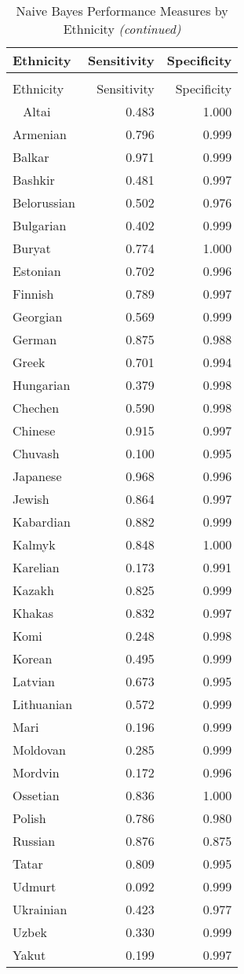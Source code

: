 \begingroup\fontsize{7}{9}\selectfont

\begin{longtable}{lrr}
\caption{\label{tab:sens_spec}Naive Bayes Performance Measures by Ethnicity}\\
\toprule
Ethnicity & Sensitivity & Specificity\\
\midrule
\endfirsthead
\caption[]{Naive Bayes Performance Measures by Ethnicity \textit{(continued)}}\\
\toprule
Ethnicity & Sensitivity & Specificity\\
\midrule
\endhead
\
\endfoot
\bottomrule
\endlastfoot
Altai & 0.483 & 1.000\\
Armenian & 0.796 & 0.999\\
Balkar & 0.971 & 0.999\\
Bashkir & 0.481 & 0.997\\
Belorussian & 0.502 & 0.976\\
Bulgarian & 0.402 & 0.999\\
Buryat & 0.774 & 1.000\\
Estonian & 0.702 & 0.996\\
Finnish & 0.789 & 0.997\\
Georgian & 0.569 & 0.999\\
German & 0.875 & 0.988\\
Greek & 0.701 & 0.994\\
Hungarian & 0.379 & 0.998\\
Chechen & 0.590 & 0.998\\
Chinese & 0.915 & 0.997\\
Chuvash & 0.100 & 0.995\\
Japanese & 0.968 & 0.996\\
Jewish & 0.864 & 0.997\\
Kabardian & 0.882 & 0.999\\
Kalmyk & 0.848 & 1.000\\
Karelian & 0.173 & 0.991\\
Kazakh & 0.825 & 0.999\\
Khakas & 0.832 & 0.997\\
Komi & 0.248 & 0.998\\
Korean & 0.495 & 0.999\\
Latvian & 0.673 & 0.995\\
Lithuanian & 0.572 & 0.999\\
Mari & 0.196 & 0.999\\
Moldovan & 0.285 & 0.999\\
Mordvin & 0.172 & 0.996\\
Ossetian & 0.836 & 1.000\\
Polish & 0.786 & 0.980\\
Russian & 0.876 & 0.875\\
Tatar & 0.809 & 0.995\\
Udmurt & 0.092 & 0.999\\
Ukrainian & 0.423 & 0.977\\
Uzbek & 0.330 & 0.999\\
Yakut & 0.199 & 0.997\\*
\end{longtable}\endgroup{}